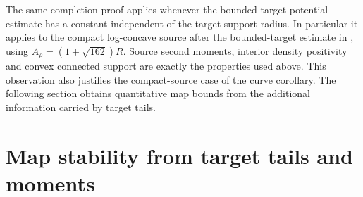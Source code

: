 \documentclass[11pt]{article}
\numberwithin{equation}{section}
\theoremstyle{remark}
\begin{document}
The same completion proof applies whenever the bounded-target potential estimate has a constant independent of the target-support radius. In particular it applies to the compact log-concave source after the bounded-target estimate in , using $A_\rho=(1+\sqrt{162})R$. Source second moments, interior density positivity and convex connected support are exactly the properties used above. This observation also justifies the compact-source case of the curve corollary. The following section obtains quantitative map bounds from the additional information carried by target tails.

\section{Map stability from target tails and moments}\label{sec:tails}
\end{document}
